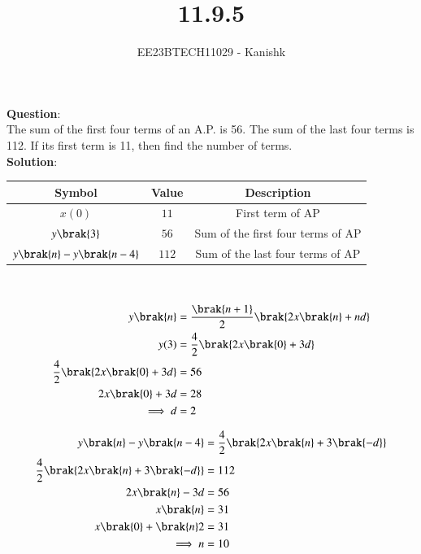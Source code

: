 \documentclass[journal,12pt,twocolumn]{IEEEtran}
\theoremstyle{remark}
\begin{document}

\vspace{3cm}

\title{11.9.5}
\author{EE23BTECH11029 - Kanishk}
\maketitle

\bigskip



\renewcommand{\thefigure}{\theenumi}
\renewcommand{\thetable}{\theenumi}
\textbf{Question}:\\ 
The sum of the first four terms of an A.P. is 56. The sum of the last four terms is
112. If its first term is 11, then find the number of terms.\\

\textbf{Solution}:\\ 

\footnotesize
\centering
\begin{tabular}{|c|c|c|}
\hline
Symbol & Value & Description\\
\hline
$x(0)$ & $11$ & First term of AP \\
\hline
$y\brak{3}$ & $56$ & Sum of the first four terms of AP\\
\hline
$y\brak{n}-y\brak{n-4}$ & $112$& Sum of the last four terms of AP\\
\hline
\end{tabular}
\\
\small


\begin{align}
y\brak{n}&=\frac{\brak{n+1}}{2}\brak{2x\brak{n}+nd}\\
y(3)&=\frac{4}{2}\brak{2x\brak{0}+3d}\\
\frac{4}{2}\brak{2x\brak{0}+3d}&=56\\
2x\brak{0}+3d&=28\\
\implies d&=2
\end{align}

\begin{align}
y\brak{n}-y\brak{n-4}&=\frac{4}{2}\brak{2x\brak{n}+3\brak{-d}}\\
\frac{4}{2}\brak{2x\brak{n}+3\brak{-d}}&=112\\
2x\brak{n}-3d&=56\\
x\brak{n}&=31\\
x\brak{0}+\brak{n}2&=31\\
\implies n&=10
\end{align}
\end{document}
